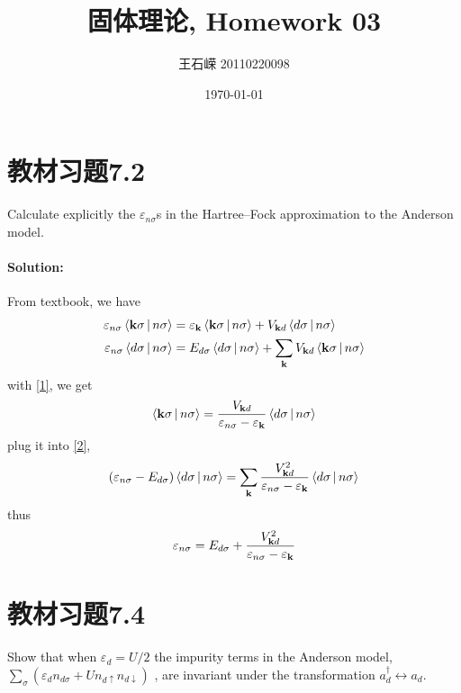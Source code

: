 \documentclass[a4paper]{article}
\title{固体理论, Homework 03}
\author{王石嵘 20110220098}
\date{\today} %
\numberwithin{equation}{section}
\begin{document}
\maketitle





\section{教材习题7.2}
Calculate explicitly the $ \varepsilon_{n\sigma} $s in the Hartree–Fock approximation to the Anderson model.
\paragraph{Solution:}
From textbook, we have
\begin{align}
\varepsilon_{n\sigma} \Braket{\vb{k}\sigma | n\sigma} &= \varepsilon_{\vb{k}} \Braket{\vb{k}\sigma | n\sigma} + V_{\vb{k}d} \Braket{d\sigma | n\sigma} \label{1}\\
\varepsilon_{n\sigma} \Braket{d\sigma | n\sigma} &= E_{d\sigma} \Braket{d\sigma | n\sigma} + \sum_{\vb{k}}V_{\vb{k}d} \Braket{\vb{k}\sigma | n\sigma} \label{2}
\end{align}
with \eqref{1}, we get
\begin{equation}\label{key}
 \Braket{\vb{k}\sigma | n\sigma} =  \dfrac{V_{\vb{k}d} }{\varepsilon_{n\sigma} - \varepsilon_{\vb{k}} }\Braket{d\sigma | n\sigma}
\end{equation}
plug it into \eqref{2},
\begin{equation}\label{key}
(\varepsilon_{n\sigma} - E_{d\sigma} ) \Braket{d\sigma | n\sigma} =  \sum_{\vb{k}} \dfrac{V_{\vb{k}d}^2 }{\varepsilon_{n\sigma} - \varepsilon_{\vb{k}} }\Braket{d\sigma | n\sigma}
\end{equation}
thus
\begin{equation}\label{key}
\varepsilon_{n\sigma} = E_{d\sigma} + \dfrac{V_{\vb{k}d}^2 }{\varepsilon_{n\sigma} - \varepsilon_{\vb{k}} }
\end{equation}

\section{教材习题7.4}
Show that when $ \varepsilon_d = U/2$ the impurity terms in the Anderson model,
$ \sum_\sigma (\varepsilon_d n_{d\sigma} + U n_{d\uparrow} n_{d\downarrow}) $
, are invariant under the transformation $ a_d^\dagger \leftrightarrow a_d $.
\end{document}
